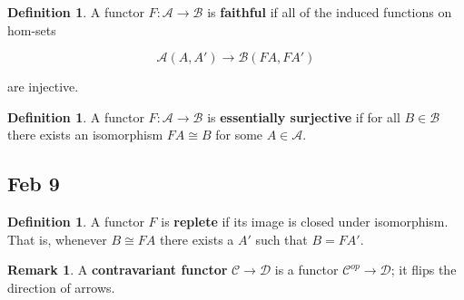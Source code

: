 \documentclass[11pt]{amsart}
\theoremstyle{plain}
\theoremstyle{definition}
\newtheorem{rem}[thm]{Remark}
\newtheorem{defn}[thm]{Definition}
\newcommand{\cA}{{\mathcal A}}
\newcommand{\cB}{{\mathcal B}}
\newcommand{\cC}{{\mathcal C}}
\newcommand{\cD}{{\mathcal D}}
\newcommand{\noi}{{\noindent}}
\begin{document}
\begin{defn}
A functor $F : \cA \to \cB$ is \textbf{faithful} if all of the induced functions on hom-sets 

  \[ \cA(A, A') \to \cB(FA, FA')\]
  
\noi are injective. 
\end{defn}

\begin{defn}
A functor $F : \cA \to \cB$ is \textbf{essentially surjective} if for all $B \in \cB$ there exists an isomorphism $FA \cong B$ for some $A \in \cA$. 
\end{defn}


\subsection{Feb 9}

\begin{defn}
A functor $F$ is \textbf{replete} if its image is closed under isomorphism. That is, whenever $B \cong FA$ there exists a $A'$ such that $B = FA'$. 
\end{defn}

\begin{rem}
A \textbf{contravariant functor} $\cC \to \cD$ is a functor $\cC^{op} \to \cD$; it flips the direction of arrows. 
\end{rem}
\end{document}

